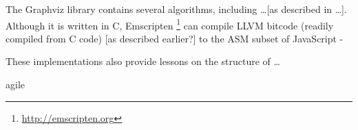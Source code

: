 The Graphviz library contains several algorithms, including \ldots [as described in \ldots]. Although it is written in C, Emscripten \footnote{\url{http://emscripten.org}} can compile LLVM bitcode (readily compiled from C code) [as described earlier?] to the ASM subset of JavaScript -

These implementations also provide lessons on the structure of \ldots



agile
